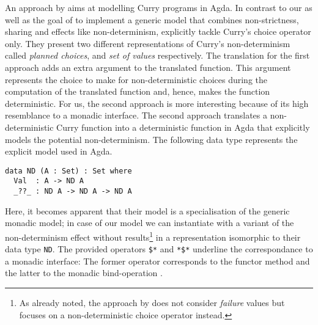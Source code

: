 An approach by \citet{antoy2017proving} aims at modelling Curry programs in Agda.
In contrast to our as well as the goal of \citeauthor{fischer2009purely} to implement a generic model that combines non\--strictness, sharing and effects like non\--determinism, \citeauthor{antoy2017proving} explicitly tackle Curry's choice operator only.
They present two different representations of Curry's non\--determinism called \emph{planned choices}, and \emph{set of values} respectively.
The translation for the first approach adds an extra argument to the translated function.
This argument represents the choice to make for non\--deterministic choices during the computation of the translated function and, hence, makes the function deterministic.
For us, the second approach is more interesting because of its high resemblance to a monadic interface.
The second approach translates a non\--deterministic Curry function into a deterministic function in Agda that explicitly models the potential non\--determinism.
The following data type represents the explicit model used in Agda.

\begin{verbatim}
data ND (A : Set) : Set where
  Val  : A -> ND A
  _??_ : ND A -> ND A -> ND A
\end{verbatim}

Here, it becomes apparent that their model is a specialisation of the generic monadic model; in case of our model we can instantiate  with a variant of the non\--determinism effect  without  results\footnote{As already noted, the approach by \citeauthor{antoy2017proving} does not consider \emph{failure} values but focuses on a non\--deterministic choice operator instead.} in a representation isomorphic to their data type \texttt{ND}.
The provided operators \texttt{\$*} and \texttt{*\$*} underline the correspondance to a monadic interface: The former operator corresponds to the functor method  and the latter to the monadic bind\--operation \hinl{>>=}.


